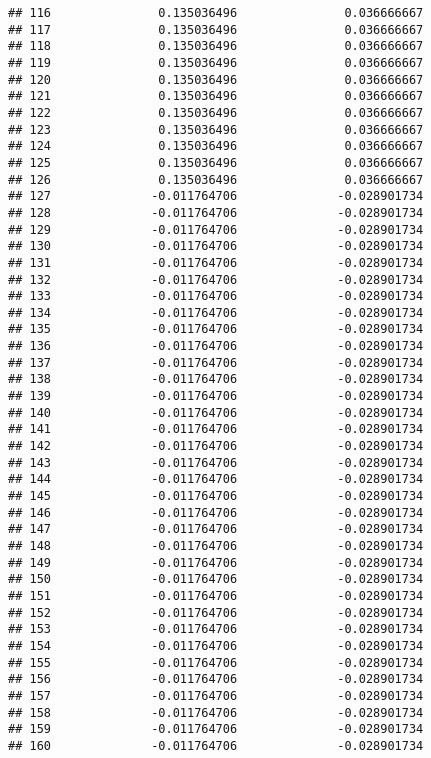 \documentclass[]{article}
\begin{document}
\begin{verbatim}
## 116               0.135036496               0.036666667
## 117               0.135036496               0.036666667
## 118               0.135036496               0.036666667
## 119               0.135036496               0.036666667
## 120               0.135036496               0.036666667
## 121               0.135036496               0.036666667
## 122               0.135036496               0.036666667
## 123               0.135036496               0.036666667
## 124               0.135036496               0.036666667
## 125               0.135036496               0.036666667
## 126               0.135036496               0.036666667
## 127              -0.011764706              -0.028901734
## 128              -0.011764706              -0.028901734
## 129              -0.011764706              -0.028901734
## 130              -0.011764706              -0.028901734
## 131              -0.011764706              -0.028901734
## 132              -0.011764706              -0.028901734
## 133              -0.011764706              -0.028901734
## 134              -0.011764706              -0.028901734
## 135              -0.011764706              -0.028901734
## 136              -0.011764706              -0.028901734
## 137              -0.011764706              -0.028901734
## 138              -0.011764706              -0.028901734
## 139              -0.011764706              -0.028901734
## 140              -0.011764706              -0.028901734
## 141              -0.011764706              -0.028901734
## 142              -0.011764706              -0.028901734
## 143              -0.011764706              -0.028901734
## 144              -0.011764706              -0.028901734
## 145              -0.011764706              -0.028901734
## 146              -0.011764706              -0.028901734
## 147              -0.011764706              -0.028901734
## 148              -0.011764706              -0.028901734
## 149              -0.011764706              -0.028901734
## 150              -0.011764706              -0.028901734
## 151              -0.011764706              -0.028901734
## 152              -0.011764706              -0.028901734
## 153              -0.011764706              -0.028901734
## 154              -0.011764706              -0.028901734
## 155              -0.011764706              -0.028901734
## 156              -0.011764706              -0.028901734
## 157              -0.011764706              -0.028901734
## 158              -0.011764706              -0.028901734
## 159              -0.011764706              -0.028901734
## 160              -0.011764706              -0.028901734

\end{verbatim}
\end{document}
